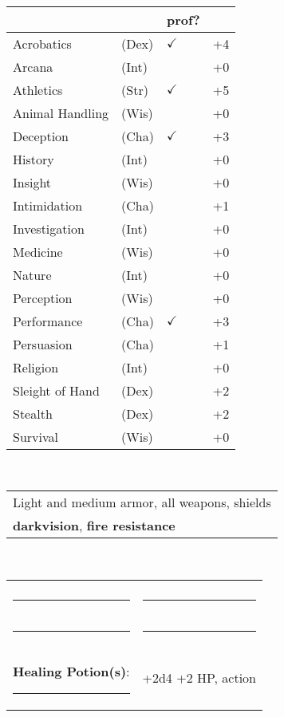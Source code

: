 \documentclass[twocolumn]{article}
\begin{document}
\\
\noindent\begin{tabular}{llll}
 & & prof? & \\
\hline
Acrobatics & (Dex) & $\checkmark$ &+4 \\
Arcana & (Int) &  & +0 \\ 
Athletics & (Str) & $\checkmark$ & +5\\
Animal Handling & (Wis) &  & +0\\
Deception & (Cha) & $\checkmark$ & +3 \\
History & (Int) &  & +0 \\
Insight & (Wis) &  & +0 \\
Intimidation & (Cha) &  & +1 \\
Investigation & (Int) &  & +0 \\
Medicine & (Wis) &  & +0 \\
Nature & (Int) &  & +0 \\
Perception & (Wis) &  & +0 \\
Performance & (Cha) & $\checkmark$ & +3 \\
Persuasion & (Cha) &  & +1 \\
Religion & (Int) &  & +0 \\
Sleight of Hand & (Dex) &  & +2 \\
Stealth & (Dex) &  & +2 \\
Survival & (Wis) &  & +0 \\
\hline
\end{tabular}
\vspace{12pt}

\\
\noindent\begin{tabular}{|m{3.1in}|}
\hline
Light and medium armor, all weapons, shields \\
\textbf{darkvision}, \textbf{fire resistance} \\
\hline
\end{tabular}
\vspace{12pt}


\\
\noindent\begin{tabular}{|ll|}
\hline&\\
\rule{1.4in}{.2pt}&\rule{1.4in}{.2pt}\\
\rule{1.4in}{.2pt}&\rule{1.4in}{.2pt}\\
\textbf{Healing Potion(s)}: \rule{.2in}{.2pt}& +2d4 +2 HP, {\sc action}\\
\hline
\end{tabular}
\vspace{12pt}
\end{document}
